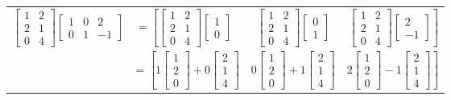 \documentclass[10pt]{article}
\begin{document}
\begin{center}
\begin{tabular}{rlcr}
$\begin {bmatrix} 1&2\\2&1\\0&4 \end {bmatrix}\begin {bmatrix} 1&0&2\\0&1&-1 \end {bmatrix} 
$&$=
\left[ 
\begin{bmatrix}1&2\\2&1\\0&4 \end {bmatrix} \begin {bmatrix} 1\\0 \end {bmatrix}\right.$
&$\begin{bmatrix}1&2\\2&1\\0&4 \end {bmatrix} \begin {bmatrix} 0\\1 \end {bmatrix}$
&$\left. \begin{bmatrix}1&2\\2&1\\0&4 \end {bmatrix} \begin {bmatrix} 2\\-1 \end {bmatrix}\right]$
\\&=
$\left[
1\begin{bmatrix}1\\2\\0 \end {bmatrix}+ 0 \begin{bmatrix}2\\1\\4 \end {bmatrix}\right.$
&$0\begin{bmatrix}1\\2\\0 \end {bmatrix}+ 1 \begin{bmatrix}2\\1\\4 \end {bmatrix}$
&$2\left.\begin{bmatrix}1\\2\\0 \end {bmatrix} -1 \begin{bmatrix}2\\1\\4 \end {bmatrix}
\right]$
\end{tabular}
\end{center}
\end{document}
